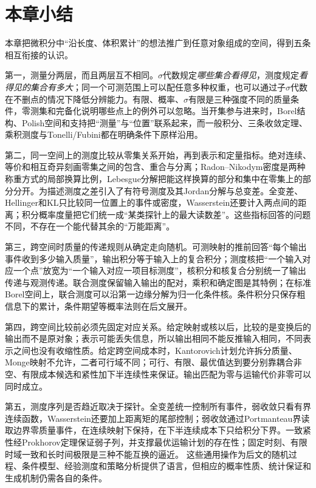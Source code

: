 \section{本章小结}

本章把微积分中“沿长度、体积累计”的想法推广到任意对象组成的空间，得到五条相互衔接的认识。

第一，测量分两层，而且两层互不相同。$\sigma$代数规定\emph{哪些集合看得见}，测度规定\emph{看得见的集合有多大}；同一个可测范围上可以配任意多种权重，也可以通过子$\sigma$代数在不删点的情况下降低分辨能力。有限、概率、$\sigma$有限是三种强度不同的质量条件，零测集和完备化说明哪些点上的例外可以忽略。当开集参与进来时，Borel结构、Polish空间和支持把“测量”与“位置”联系起来，而一般积分、三条收敛定理、乘积测度与Tonelli/Fubini都在明确条件下原样沿用。

第二，同一空间上的测度比较从零集关系开始，再到表示和定量指标。绝对连续、等价和相互奇异刻画零集之间的包含、重合与分离；Radon–Nikodym密度是两种称重方式的局部换算比例，Lebesgue分解把能这样换算的部分和集中在零集上的部分分开。为描述测度之差引入了有符号测度及其Jordan分解与总变差。全变差、Hellinger和KL只比较同一位置上的事件或密度，Wasserstein还要计入两点间的距离；积分概率度量把它们统一成“某类探针上的最大读数差”。这些指标回答的问题不同，不存在一个能代替其余的“万能距离”。

第三，跨空间时质量的传递规则从确定走向随机。可测映射的推前回答“每个输出事件收到多少输入质量”，输出积分等于输入上的复合积分；测度核把“一个输入对应一个点”放宽为“一个输入对应一项目标测度”，核积分和核复合分别统一了输出传递与观测传递。联合测度保留输入输出的配对，乘积和确定图是其特例；在标准Borel空间上，联合测度可以沿第一边缘分解为归一化条件核。条件积分只保存粗信息下的累计，条件期望等概率法则在后文展开。

第四，跨空间比较前必须先固定对应关系。给定映射或核以后，比较的是变换后的输出而不是原对象；表示可能丢失信息，所以输出相同不能反推输入相同，不同表示之间也没有收缩性质。给定跨空间成本时，Kantorovich计划允许拆分质量、Monge映射不允许，二者可行域不同；可行、有限、最优值达到要分别靠耦合非空、有限成本候选和紧性加下半连续性来保证。输出匹配为零与运输代价非零可以同时成立。

第五，测度序列是否趋近取决于探针。全变差统一控制所有事件，弱收敛只看有界连续函数，Wasserstein还要加上距离矩的尾部控制；弱收敛通过Portmanteau界读取边界零质量事件，在连续映射下保持，在下半连续成本下只给积分下界。一致紧性经Prokhorov定理保证弱子列，并支撑最优运输计划的存在性；固定时刻、有限时域一致和长时间极限是三种不能互换的逼近。
这些通用操作为后文的随机过程、条件模型、经验测度和策略分析提供了语言，但相应的概率性质、统计保证和生成机制仍需各自的条件。
